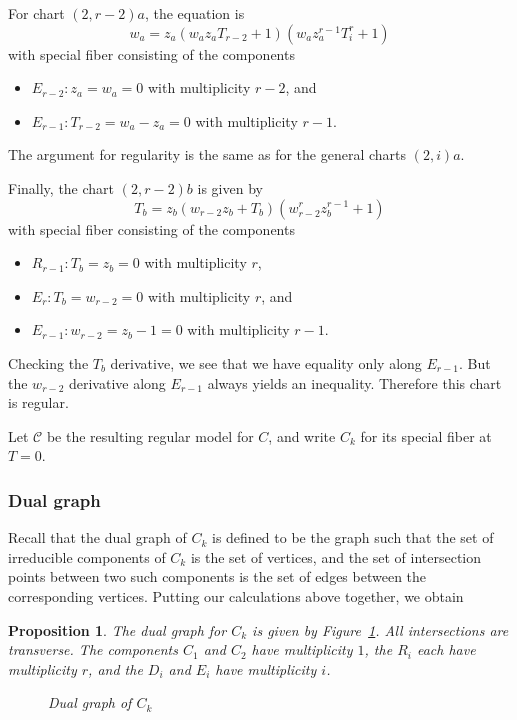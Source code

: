 \documentclass[pagesize,paper=letter]{scrartcl}
\newcommand{\scd}{\mathscr{C}}
\theoremstyle{plain}
\newtheorem{proposition}[theorem]{Proposition}
\theoremstyle{definition}
\theoremstyle{remark}
\begin{document}
  For chart $(2, r-2)a$, the equation is
  \[
  w_a = z_a (w_a z_a T_{r-2} + 1) ( w_a z_a^{r-1} T_i^{r} + 1)
  \]
  with special fiber consisting of the components
  \begin{itemize}
      \item $E_{r-2}: z_a = w_a = 0$ with multiplicity $r-2$, and
      \item $E_{r-1}: T_{r-2} = w_a - z_a = 0$ with multiplicity $r-1$.
  \end{itemize}
  The argument for regularity is the same as for the general charts $(2,i)a$.

  Finally, the chart $(2, r-2)b$ is given by
  \[
  T_b = z_b (w_{r-2} z_b + T_b) (w_{r-2}^{r} z_b^{r-1} + 1)
  \]
  with special fiber consisting of the components
  \begin{itemize}
      \item $R_{r-1}: T_b = z_b = 0$ with multiplicity $r$,
      \item $E_r: T_b = w_{r-2} = 0$ with multiplicity $r$, and
      \item $E_{r-1}: w_{r-2} = z_b - 1 = 0$ with multiplicity $r-1$.
  \end{itemize}
  Checking the $T_b$ derivative, we see that we have equality only along $E_{r-1}$. But the $w_{r-2}$ derivative along $E_{r-1}$ always yields an inequality. Therefore this chart is regular.

  Let $\scd$ be the resulting regular model for $C$, and write $C_k$ for its special fiber at $T = 0$.

\subsubsection{Dual graph}
\label{sec:dual-graph}

Recall that the dual graph of $C_k$ is defined to be the graph such that the set of irreducible components of $C_k$ is the set of vertices, and the set of intersection points between two such components is the set of edges between the corresponding vertices. Putting our calculations above together, we obtain
\begin{proposition}\label{prop:dual-graph-plus-multiplicities}
  The dual graph for $C_k$ is given by Figure~\ref{fig:superelliptic-dual-graph}. All intersections are transverse. The components $C_1$ and $C_2$ have multiplicity $1$, the $R_i$ each have multiplicity $r$, and the $D_i$ and $E_i$ have multiplicity $i$.
\begin{figure}[h]\centering
    
  \caption{Dual graph of $C_k$}
\label{fig:superelliptic-dual-graph}
\end{figure}
\end{proposition}
\end{document}
